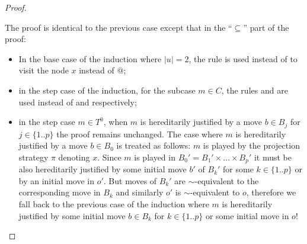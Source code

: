 \begin{proof}
\begin{enumerate}[$\bullet$]
    The proof is identical to the previous case except that in
    the ``$\subseteq$'' part of the proof:
    \begin{itemize}
        \item In the base case of the induction where $|u|=2$,
        the rule  is used instead of  to visit the node $x$ instead of $@$;
        \item in the step case of the induction, for the subcase $m\in C$, the rules  and  are used instead of  and  respectively;
        \item in the step case $m\in T^0$, when $m$ is hereditarily justified by a move $b \in B_j$ for
         $j\in \{1 .. p\}$ the proof remains unchanged. The case where $m$ is hereditarily justified by a move $b \in B_0$ is treated as follows: $m$ is played by the projection strategy $\pi$ denoting $x$.
         Since $m$ is played in $B_0' = B_1' \times \ldots \times B_p'$ it must be also hereditarily justified by some initial move $b'$ of $B_k'$ for some $k \in \{1.. p\}$ or by an initial move in $o'$. But moves of $B_k'$ are $\sim$-equivalent to the corresponding move in $B_k$ and similarly $o'$ is $\sim$-equivalent to $o$, therefore we fall back to the previous case of the induction where $m$ is hereditarily justified by some initial move $b\in B_k$ for $k\in \{1..p\}$ or some initial move in $o$!
    \end{itemize}


\end{enumerate}


\end{proof}


